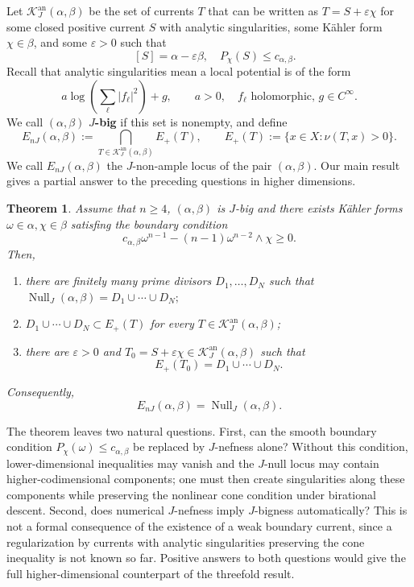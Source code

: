 \documentclass[reqno]{amsart}
\newcommand{\JNull}{\operatorname{Null}_{J}}
\newcommand{\JEnK}{E_{nJ}}
\newcommand{\cab}{c_{\alpha,\beta}}
\theoremstyle{plain}
\newtheorem{thm}{Theorem}
\theoremstyle{remark}
\begin{document}
Let
$\mathcal K_J^{\mathrm{an}}(\alpha,\beta)$ be the set of currents $T$ that can be written as $T=S+\varepsilon \chi$ for some closed positive current $S$ with analytic singularities, some K\"ahler form $\chi\in \beta$, and some $\varepsilon>0$ such that 
\[\quad [S]=\alpha-\varepsilon\beta,
 \quad P_\chi(S)\leq\cab.
\] Recall that analytic singularities mean a
local potential is of the form
\[
a\log\left(\sum_{\ell}|f_\ell|^2\right)+g,
 \qquad a>0,\quad f_\ell \text{ holomorphic, } g\in C^\infty.
    \]  We call
$(\alpha,\beta)$ \textbf{$J$-big} if this set is nonempty, and define
\[
E_{nJ}(\alpha,\beta)
 :=\bigcap_{T\in\mathcal K_J^{\mathrm{an}}(\alpha,\beta)}E_+(T),
 \qquad E_+(T):=\{x\in X:\nu(T,x)>0\}.
\]
We call $\JEnK(\alpha,\beta)$ the $J$-non-ample locus of the pair $(\alpha,\beta)$.
Our main result gives a partial answer to the preceding questions
in higher dimensions.

\begin{thm}\label{thm:main}
Assume that $n\geq4$,  $(\alpha,\beta)$ is $J$-big and there exists K\"ahler forms $\omega\in \alpha,\chi\in \beta$ satisfing
the boundary condition
\begin{equation}\label{eq:intro-boundary}
\cab\omega^{n-1}-(n-1)\omega^{n-2}\wedge\chi\geq 0.
\end{equation}
Then,
\begin{enumerate}
\item there are finitely many prime
divisors $D_1,\ldots,D_N$ such that
$\JNull(\alpha,\beta)=D_1\cup\cdots\cup D_N;$
 \item $D_1\cup\cdots\cup D_N\subset E_+(T)$ for every
 $T\in\mathcal K_J^{\mathrm{an}}(\alpha,\beta)$;
 \item there are $\varepsilon>0$ and
 $T_0=S+\varepsilon\chi\in
 \mathcal K_J^{\mathrm{an}}(\alpha,\beta)$ such that
 \[
  E_+(T_0)=D_1\cup\cdots\cup D_N.
 \]
\end{enumerate}
Consequently,
\[
 \JEnK(\alpha,\beta)=\JNull(\alpha,\beta).
\]
\end{thm}

The theorem leaves two natural questions. First, can the smooth
boundary condition $P_\chi(\omega)\leq \cab$ be replaced by
$J$-nefness alone? Without this condition, lower-dimensional
inequalities may vanish and the $J$-null locus may contain
higher-codimensional components; one must then create singularities
along these components while preserving the nonlinear cone condition
under birational descent. Second, does numerical $J$-nefness imply
$J$-bigness automatically? This is not a formal consequence of
the existence of a weak boundary current, since a regularization by
currents with analytic singularities preserving the cone
inequality is not known so far. Positive answers to both questions would give the full
higher-dimensional counterpart of the threefold result. 
\end{document}
